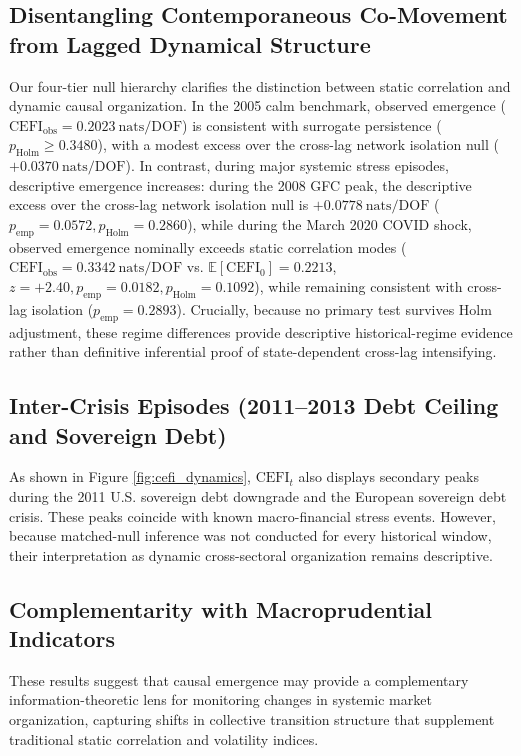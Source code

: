 \documentclass[review,12pt,authoryear]{elsarticle}
\begin{document}
\subsection{Disentangling Contemporaneous Co-Movement from Lagged Dynamical Structure}
Our four-tier null hierarchy clarifies the distinction between static correlation and dynamic causal organization. In the 2005 calm benchmark, observed emergence ($\mathrm{CEFI}_{\text{obs}} = 0.2023\ \mathrm{nats/DOF}$) is consistent with surrogate persistence ($p_{\text{Holm}} \ge 0.3480$), with a modest excess over the cross-lag network isolation null ($+0.0370\ \mathrm{nats/DOF}$). In contrast, during major systemic stress episodes, descriptive emergence increases: during the 2008 GFC peak, the descriptive excess over the cross-lag network isolation null is $+0.0778\ \mathrm{nats/DOF}$ ($p_{\text{emp}} = 0.0572, p_{\text{Holm}} = 0.2860$), while during the March 2020 COVID shock, observed emergence nominally exceeds static correlation modes ($\mathrm{CEFI}_{\text{obs}} = 0.3342\ \mathrm{nats/DOF}$ vs. $\mathbb{E}[\mathrm{CEFI}_0] = 0.2213$, $z = +2.40, p_{\text{emp}} = 0.0182, p_{\text{Holm}} = 0.1092$), while remaining consistent with cross-lag isolation ($p_{\text{emp}} = 0.2893$). Crucially, because no primary test survives Holm adjustment, these regime differences provide descriptive historical-regime evidence rather than definitive inferential proof of state-dependent cross-lag intensifying.

\subsection{Inter-Crisis Episodes (2011--2013 Debt Ceiling and Sovereign Debt)}
As shown in Figure \ref{fig:cefi_dynamics}, $\mathrm{CEFI}_t$ also displays secondary peaks during the 2011 U.S. sovereign debt downgrade and the European sovereign debt crisis. These peaks coincide with known macro-financial stress events. However, because matched-null inference was not conducted for every historical window, their interpretation as dynamic cross-sectoral organization remains descriptive.

\subsection{Complementarity with Macroprudential Indicators}
These results suggest that causal emergence may provide a complementary information-theoretic lens for monitoring changes in systemic market organization, capturing shifts in collective transition structure that supplement traditional static correlation and volatility indices.
\end{document}
